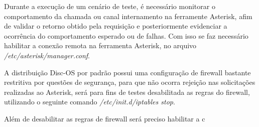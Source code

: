 Durante a execução de um cenário de teste, é necessário monitorar o comportamento da chamada ou canal internamento na ferramente Asterisk,
afim de validar o retorno obtido pela requisição e posteriormente evidenciar a ocorrência do comportamento esperado ou de falhas. Com isso se faz necessário habilitar a conexão remota na ferramenta Asterisk, no arquivo \textit{/etc/asterisk/manager.conf}.

A distribuição Disc-OS por padrão possui uma configuração de firewall bastante restritiva por questões de segurança, para que não ocorra rejeição nas solicitações realizadas ao Asterisk, será para fins de testes desabilitada as regras do firewall, utilizando o seguinte comando \textit{/etc/init.d/iptables stop}.
 
 Além de desabilitar as regras de firewall será preciso habilitar a c
 


